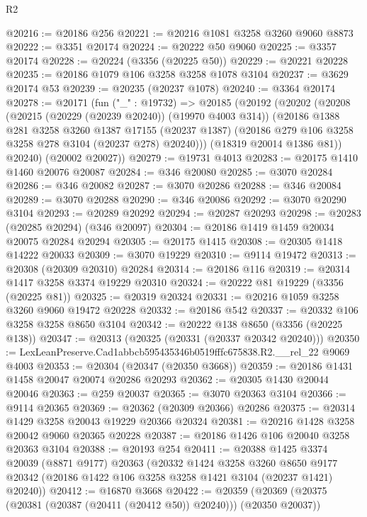 \begin{lexlean}{R2}
\begin{coremodule}
@20216 := @20186 @256
@20221 := @20216 @1081 @3258 @3260 @9060 @8873
@20222 := @3351 @20174
@20224 := @20222 @50 @9060
@20225 := @3357 @20174
@20228 := @20224 (@3356 (@20225 @50))
@20229 := @20221 @20228
@20235 := @20186 @1079 @106 @3258 @3258 @1078 @3104
@20237 := @3629 @20174 @53
@20239 := @20235 (@20237 @1078)
@20240 := @3364 @20174
@20278 := @20171
    (fun ("_" : @19732) =>
    @20185
      (@20192
        (@20202
          (@20208
            (@20215 (@20229 (@20239 @20240)) (@19970 @4003 @314))
            (@20186
              @1388
              @281
              @3258
              @3260
              @1387
              @17155
              (@20237 @1387)
              (@20186 @279 @106 @3258 @3258 @278 @3104 (@20237 @278) @20240)))
          (@18319 @20014 @1386 @81))
        @20240)
      (@20002 @20027))
@20279 := @19731 @4013
@20283 := @20175 @1410 @1460 @20076 @20087
@20284 := @346 @20080
@20285 := @3070 @20284
@20286 := @346 @20082
@20287 := @3070 @20286
@20288 := @346 @20084
@20289 := @3070 @20288
@20290 := @346 @20086
@20292 := @3070 @20290 @3104
@20293 := @20289 @20292
@20294 := @20287 @20293
@20298 := @20283 (@20285 @20294) (@346 @20097)
@20304 := @20186 @1419 @1459 @20034 @20075 @20284 @20294
@20305 := @20175 @1415
@20308 := @20305 @1418 @14222 @20033
@20309 := @3070 @19229
@20310 := @9114 @19472
@20313 := @20308 (@20309 @20310) @20284
@20314 := @20186 @116
@20319 := @20314 @1417 @3258 @3374 @19229 @20310
@20324 := @20222 @81 @19229 (@3356 (@20225 @81))
@20325 := @20319 @20324
@20331 := @20216 @1059 @3258 @3260 @9060 @19472 @20228
@20332 := @20186 @542
@20337 := @20332 @106 @3258 @3258 @8650 @3104
@20342 := @20222 @138 @8650 (@3356 (@20225 @138))
@20347 := @20313 (@20325 (@20331 (@20337 @20342 @20240)))
@20350 := LexLeanPreserve.Cad1abbcb595435346b0519fffc675838.R2.__rel_22 @9069 @4003
@20353 := @20304 (@20347 (@20350 @3668))
@20359 := @20186 @1431 @1458 @20047 @20074 @20286 @20293
@20362 := @20305 @1430 @20044 @20046
@20363 := @259 @20037
@20365 := @3070 @20363 @3104
@20366 := @9114 @20365
@20369 := @20362 (@20309 @20366) @20286
@20375 := @20314 @1429 @3258 @20043 @19229 @20366 @20324
@20381 := @20216 @1428 @3258 @20042 @9060 @20365 @20228
@20387 := @20186 @1426 @106 @20040 @3258 @20363 @3104
@20388 := @20193 @254
@20411 := @20388
    @1425
    @3374
    @20039
    (@8871 @9177)
    @20363
    (@20332
      @1424
      @3258
      @3260
      @8650
      @9177
      @20342
      (@20186 @1422 @106 @3258 @3258 @1421 @3104 (@20237 @1421) @20240))
@20412 := @16870 @3668
@20422 := @20359 (@20369 (@20375 (@20381 (@20387 (@20411 (@20412 @50)) @20240))) (@20350 @20037))

\end{coremodule}
\end{lexlean}
